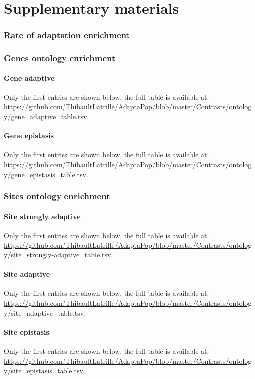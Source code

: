\documentclass{article}
\begin{document}
\part*{Supplementary materials}
\tableofcontents
 
\pagebreak

\section{Rate of adaptation enrichment}


\section{Genes ontology enrichment}

\subsection{Gene adaptive}
Only the first entries are shown below, the full table is available at:
\url{https://github.com/ThibaultLatrille/AdaptaPop/blob/master/Contrasts/ontology/gene_adaptive_table.tsv}.


\subsection{Gene epistasis}
Only the first entries are shown below, the full table is available at:
\url{https://github.com/ThibaultLatrille/AdaptaPop/blob/master/Contrasts/ontology/gene_epistasis_table.tsv}.



\section{Sites ontology enrichment}

\subsection{Site strongly adaptive}
Only the first entries are shown below, the full table is available at:
\url{https://github.com/ThibaultLatrille/AdaptaPop/blob/master/Contrasts/ontology/site_strongly-adaptive_table.tsv}.


\subsection{Site adaptive}
Only the first entries are shown below, the full table is available at:
\url{https://github.com/ThibaultLatrille/AdaptaPop/blob/master/Contrasts/ontology/site_adaptive_table.tsv}.


\subsection{Site epistasis}
Only the first entries are shown below, the full table is available at:
\url{https://github.com/ThibaultLatrille/AdaptaPop/blob/master/Contrasts/ontology/site_epistasis_table.tsv}.

\end{document}
